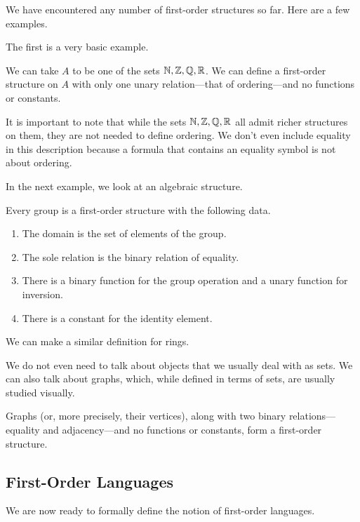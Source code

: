 We have encountered any number of first-order structures so far. Here are a few examples.

The first is a very basic example.
\begin{boxexample}[Orderings]
    We can take $A$ to be one of the sets $\mathbb{N}, \mathbb{Z}, \mathbb{Q}, \mathbb{R}$. We can define a first-order structure on $A$ with only one unary relation---that of ordering---and no functions or constants.
\end{boxexample}
It is important to note that while the sets $\mathbb{N}, \mathbb{Z}, \mathbb{Q}, \mathbb{R}$ all admit richer structures on them, they are not needed to define ordering. We don't even include equality in this description because a formula that contains an equality symbol is not about ordering.

In the next example, we look at an algebraic structure.
\begin{boxexample}[Groups]
    Every group is a first-order structure with the following data.
    \begin{enumerate}
        \item The domain is the set of elements of the group.
        \item The sole relation is the binary relation of equality.
        \item There is a binary function for the group operation and a unary function for inversion.
        \item There is a constant for the identity element.
    \end{enumerate}
\end{boxexample}
We can make a similar definition for rings.

We do not even need to talk about objects that we usually deal with as sets. We can also talk about graphs, which, while defined in terms of sets, are usually studied visually.
\begin{boxexample}[Graphs]
    Graphs (or, more precisely, their vertices), along with two binary relations---equality and adjacency---and no functions or constants, form a first-order structure.
\end{boxexample}

\subsection{First-Order Languages}

We are now ready to formally define the notion of first-order languages.

